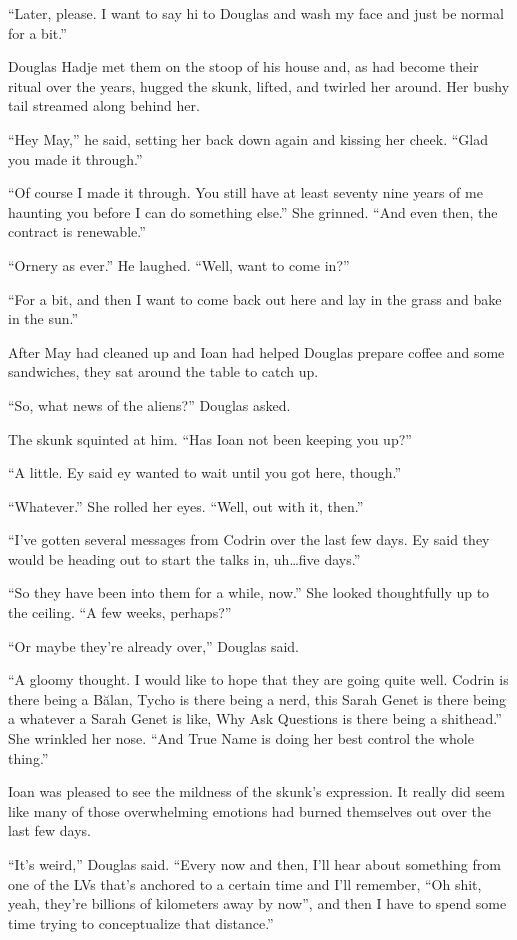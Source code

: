 ``Later, please. I want to say hi to Douglas and wash my face and just be normal for a bit.''

Douglas Hadje met them on the stoop of his house and, as had become their ritual over the years, hugged the skunk, lifted, and twirled her around. Her bushy tail streamed along behind her.

``Hey May,'' he said, setting her back down again and kissing her cheek. ``Glad you made it through.''

``Of course I made it through. You still have at least seventy nine years of me haunting you before I can do something else.'' She grinned. ``And even then, the contract is renewable.''

``Ornery as ever.'' He laughed. ``Well, want to come in?''

``For a bit, and then I want to come back out here and lay in the grass and bake in the sun.''

After May had cleaned up and Ioan had helped Douglas prepare coffee and some sandwiches, they sat around the table to catch up.

``So, what news of the aliens?'' Douglas asked.

The skunk squinted at him. ``Has Ioan not been keeping you up?''

``A little. Ey said ey wanted to wait until you got here, though.''

``Whatever.'' She rolled her eyes. ``Well, out with it, then.''

``I've gotten several messages from Codrin over the last few days. Ey said they would be heading out to start the talks in, uh\ldots five days.''

``So they have been into them for a while, now.'' She looked thoughtfully up to the ceiling. ``A few weeks, perhaps?''

``Or maybe they're already over,'' Douglas said.

``A gloomy thought. I would like to hope that they are going quite well. Codrin is there being a Bălan, Tycho is there being a nerd, this Sarah Genet is there being a whatever a Sarah Genet is like, Why Ask Questions is there being a shithead.'' She wrinkled her nose. ``And True Name is doing her best control the whole thing.''

Ioan was pleased to see the mildness of the skunk's expression. It really did seem like many of those overwhelming emotions had burned themselves out over the last few days.

``It's weird,'' Douglas said. ``Every now and then, I'll hear about something from one of the LVs that's anchored to a certain time and I'll remember, ``Oh shit, yeah, they're billions of kilometers away by now'', and then I have to spend some time trying to conceptualize that distance.''

